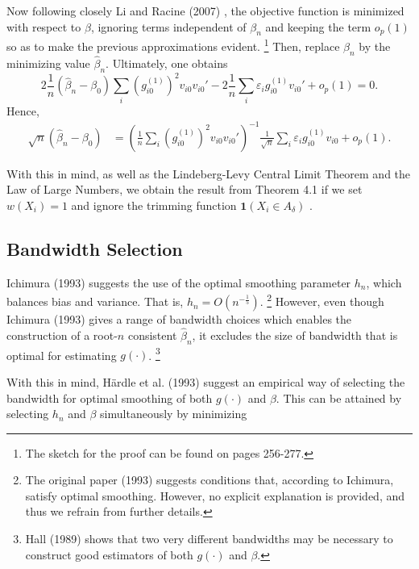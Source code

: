 \documentclass[a4paper]{article}
\begin{document}
Now following closely Li and Racine (2007) \cite{[1]}, the objective function is minimized with respect to $\beta$, ignoring terms independent of $\beta_n$ and keeping the term $o_p(1)$ so as to make the previous approximations evident. \footnote{ The sketch for the proof can be found on pages 256-277.} Then, replace $\beta_n$ by the minimizing value $\hat{\beta}_n$. Ultimately, one obtains
\[2\frac{1}{n}(\hat{\beta}_n - \beta_0)\sum_i(g_{i0}^{(1)})^2v_{i0}v_{i0}' - 2\frac{1}{n}\sum_i\varepsilon_ig_{i0}^{(1)}v_{i0}' + o_p(1) = 0.  \]
Hence, 
\begin{align*}
\sqrt{n}(\hat{\beta}_n - \beta_0) & = (\frac{1}{n}\sum_i(g_{i0}^{(1)})^2v_{i0}v_{i0}')^{-1}\frac{1}{\sqrt{n}}\sum_i\varepsilon_i g_{i0}^{(1)}v_{i0} + o_p(1).
\end{align*}

With this in mind, as well as the Lindeberg-Levy Central Limit Theorem and the Law of Large Numbers, we obtain the result from Theorem 4.1 if we set $w(X_i) = 1$ and ignore the trimming function $\mathbf{1}(X_i \in A_\delta)$ .




\subsection{Bandwidth Selection} %
\label{sub:Bandwidth Selection}

Ichimura (1993) \cite{[6]} suggests the use of the optimal smoothing parameter $h_n$, which balances bias and variance. That is, $h_n = O(n^{-\frac{1}{5}})$. \footnote{The original paper (1993) \cite{[6]} suggests conditions that, according to Ichimura, satisfy optimal smoothing. However, no explicit explanation is provided, and thus we refrain from further details.} However, even though Ichimura (1993) \cite{[6]} gives a range of bandwidth choices which enables the construction of a root-$n$ consistent $\hat{\beta}_n$, it excludes the size of bandwidth that is optimal for estimating $g(\cdot)$. \footnote{Hall (1989) \cite{[17]} shows that two very different bandwidths may be necessary to construct good estimators of both $g(\cdot)$ and $\beta$.}
 
With this in mind, H{\"a}rdle et al. (1993) \cite{[18]} suggest an empirical way of selecting the bandwidth for optimal smoothing of both $g(\cdot)$ and $\beta$. This can be attained by selecting $h_n$ and $\beta$ simultaneously by minimizing
\end{document}
